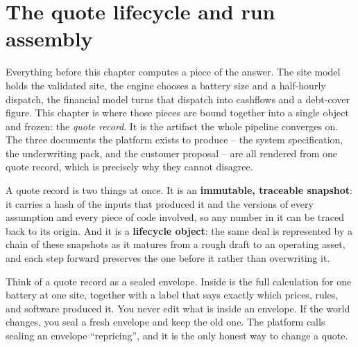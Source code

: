 \chapter{The quote lifecycle and run assembly}
\label{ch:quotes}


Everything before this chapter computes a piece of the answer. The site model holds the validated site, the engine chooses a battery size and a half-hourly dispatch, the financial model turns that dispatch into cashflows and a debt-cover figure. This chapter is where those pieces are bound together into a single object and frozen: the \emph{quote record}. It is the artifact the whole pipeline converges on. The three documents the platform exists to produce -- the system specification, the underwriting pack, and the customer proposal -- are all rendered from one quote record, which is precisely why they cannot disagree.

A quote record is two things at once. It is an \textbf{immutable, traceable snapshot}: it carries a hash of the inputs that produced it and the versions of every assumption and every piece of code involved, so any number in it can be traced back to its origin. And it is a \textbf{lifecycle object}: the same deal is represented by a chain of these snapshots as it matures from a rough draft to an operating asset, and each step forward preserves the one before it rather than overwriting it.

\begin{plainnote}
Think of a quote record as a sealed envelope. Inside is the full calculation for one battery at one site, together with a label that says exactly which prices, rules, and software produced it. You never edit what is inside an envelope. If the world changes, you seal a fresh envelope and keep the old one. The platform calls sealing an envelope ``repricing'', and it is the only honest way to change a quote.
\end{plainnote}


